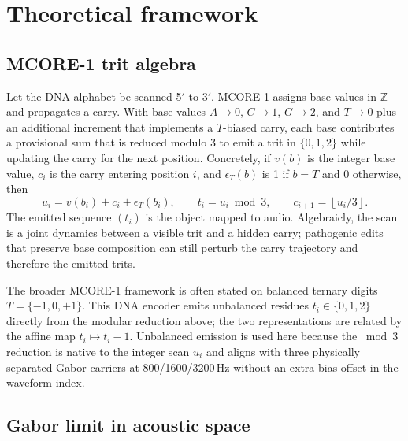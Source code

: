 \documentclass[preprint,12pt]{elsarticle}
\begin{document}
\section{Theoretical framework}

\subsection{MCORE-1 trit algebra}

Let the DNA alphabet be scanned 5$'$ to 3$'$. MCORE-1 assigns base values in $\mathbb{Z}$ and propagates a carry. With base values $A\!\rightarrow\!0$, $C\!\rightarrow\!1$, $G\!\rightarrow\!2$, and $T\!\rightarrow\!0$ plus an additional increment that implements a $T$-biased carry, each base contributes a provisional sum that is reduced modulo 3 to emit a trit in $\{0,1,2\}$ while updating the carry for the next position. Concretely, if $v(b)$ is the integer base value, $c_i$ is the carry entering position $i$, and $\epsilon_T(b)$ is 1 if $b=T$ and 0 otherwise, then
\begin{equation}
  u_i = v(b_i) + c_i + \epsilon_T(b_i), \qquad t_i = u_i \bmod 3, \qquad c_{i+1} = \left\lfloor u_i/3\right\rfloor .
\end{equation}
The emitted sequence $(t_i)$ is the object mapped to audio. Algebraicly, the scan is a joint dynamics between a visible trit and a hidden carry; pathogenic edits that preserve base composition can still perturb the carry trajectory and therefore the emitted trits.

The broader MCORE-1 framework is often stated on balanced ternary digits $T=\{-1,0,+1\}$. This DNA encoder emits unbalanced residues $t_i\in\{0,1,2\}$ directly from the modular reduction above; the two representations are related by the affine map $t_i \mapsto t_i - 1$. Unbalanced emission is used here because the $\bmod 3$ reduction is native to the integer scan $u_i$ and aligns with three physically separated Gabor carriers at 800/1600/3200\,Hz without an extra bias offset in the waveform index.

\subsection{Gabor limit in acoustic space}
\label{sec:gabor-limit}
\end{document}
